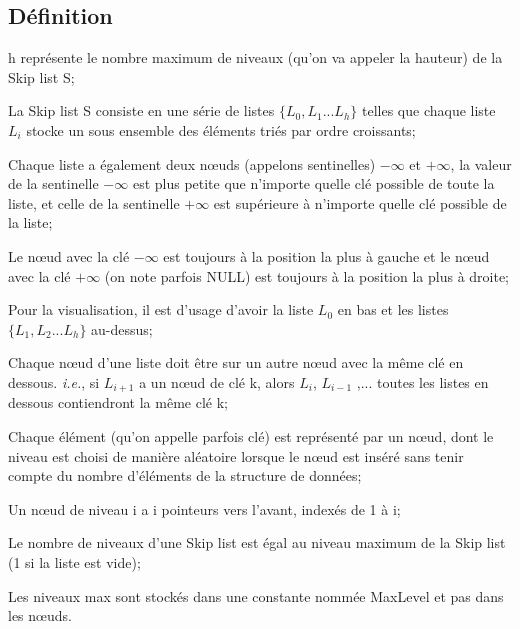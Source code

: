 \documentclass[hidelinks,a4paper,12pt]{article}
\begin{document}
 \subsection{Définition} 
\begin{description}[font=$\bullet$~\normalfont\scshape\color{red!50!black}]
	\item h représente le nombre maximum de niveaux (qu'on va appeler la hauteur) de la Skip list S;
	\item La Skip list S consiste en une série de listes $\{L_0, L_1... L_h\}$ telles que chaque liste ${L_i}$ stocke un sous ensemble des éléments triés par ordre croissants;
	\item Chaque liste a également deux nœuds (appelons sentinelles) $-\infty$ et $+\infty$, la valeur de la sentinelle $-\infty$ est plus petite que n'importe quelle clé possible de toute la liste, et celle de la sentinelle $+\infty$ est supérieure à n'importe quelle clé possible de la liste;
	\item Le nœud avec la clé $-\infty$ est toujours à la position la plus à gauche et le nœud avec la clé $+\infty$ (on note parfois NULL) est toujours à la position la plus à droite;
	\item Pour la visualisation, il est d'usage d'avoir la liste ${L_0}$ en bas et les listes $\{L_1, L_2... L_h\}$ au-dessus;
	\item Chaque nœud d'une liste doit être sur un autre nœud avec la même clé en dessous. \textit{i.e.}, si ${L_{i+1}}$ a un nœud de clé k, alors ${L_i}$, ${L_{i-1}}$ ,... toutes les listes en dessous contiendront la même clé k;
	\item Chaque élément (qu'on appelle parfois clé) est représenté par un nœud, dont le niveau est choisi de manière aléatoire lorsque le nœud est inséré sans tenir compte du nombre d'éléments de la structure de données;
	\item Un nœud de niveau i a i pointeurs vers l'avant, indexés de 1 à i;
	\item Le nombre de niveaux d'une Skip list est égal au niveau maximum de la Skip list (1 si la liste est vide);
	\item Les niveaux max sont stockés dans une constante nommée MaxLevel et pas dans les nœuds. 	
\end{description}

~\\~\\
\end{document}
